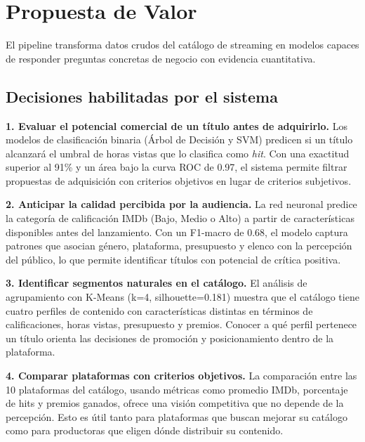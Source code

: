 \documentclass[12pt,a4paper]{article}
\begin{document}
\newpage
\section*{Propuesta de Valor}

El pipeline transforma datos crudos del cat\'alogo de streaming en modelos capaces de responder preguntas concretas de negocio con evidencia cuantitativa.

\subsection*{Decisiones habilitadas por el sistema}

\textbf{1. Evaluar el potencial comercial de un t\'itulo antes de adquirirlo.}
Los modelos de clasificaci\'on binaria (\'Arbol de Decisi\'on y SVM) predicen si un t\'itulo alcanzar\'a el umbral de horas vistas que lo clasifica como \textit{hit}. Con una exactitud superior al 91\% y un \'area bajo la curva ROC de 0.97, el sistema permite filtrar propuestas de adquisici\'on con criterios objetivos en lugar de criterios subjetivos.

\textbf{2. Anticipar la calidad percibida por la audiencia.}
La red neuronal predice la categor\'ia de calificaci\'on IMDb (Bajo, Medio o Alto) a partir de caracter\'isticas disponibles antes del lanzamiento. Con un F1-macro de 0.68, el modelo captura patrones que asocian g\'enero, plataforma, presupuesto y elenco con la percepci\'on del p\'ublico, lo que permite identificar t\'itulos con potencial de cr\'itica positiva.

\textbf{3. Identificar segmentos naturales en el cat\'alogo.}
El an\'alisis de agrupamiento con K-Means (k=4, silhouette=0.181) muestra que el cat\'alogo tiene cuatro perfiles de contenido con caracter\'isticas distintas en t\'erminos de calificaciones, horas vistas, presupuesto y premios. Conocer a qu\'e perfil pertenece un t\'itulo orienta las decisiones de promoci\'on y posicionamiento dentro de la plataforma.

\textbf{4. Comparar plataformas con criterios objetivos.}
La comparaci\'on entre las 10 plataformas del cat\'alogo, usando m\'etricas como promedio IMDb, porcentaje de hits y premios ganados, ofrece una visi\'on competitiva que no depende de la percepci\'on. Esto es \'util tanto para plataformas que buscan mejorar su cat\'alogo como para productoras que eligen d\'onde distribuir su contenido.
\end{document}
